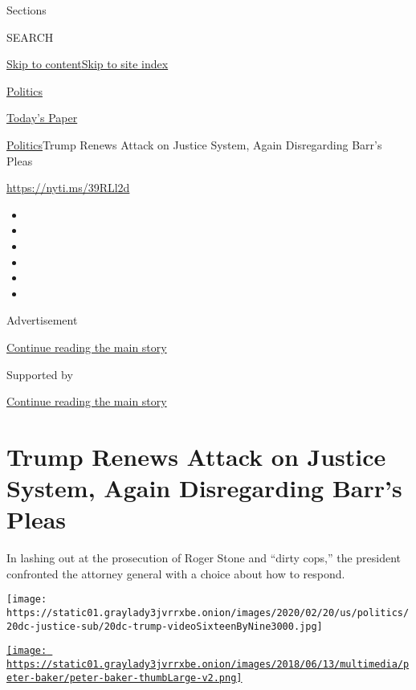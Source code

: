 Sections

SEARCH

\protect\hyperlink{site-content}{Skip to
content}\protect\hyperlink{site-index}{Skip to site index}

\href{https://www.nytimes3xbfgragh.onion/section/politics}{Politics}

\href{https://myaccount.nytimes3xbfgragh.onion/auth/login?response_type=cookie\&client_id=vi}{}

\href{https://www.nytimes3xbfgragh.onion/section/todayspaper}{Today's
Paper}

\href{/section/politics}{Politics}\textbar{}Trump Renews Attack on
Justice System, Again Disregarding Barr's Pleas

\url{https://nyti.ms/39RLl2d}

\begin{itemize}
\item
\item
\item
\item
\item
\item
\end{itemize}

Advertisement

\protect\hyperlink{after-top}{Continue reading the main story}

Supported by

\protect\hyperlink{after-sponsor}{Continue reading the main story}

\hypertarget{trump-renews-attack-on-justice-system-again-disregarding-barrs-pleas}{%
\section{Trump Renews Attack on Justice System, Again Disregarding
Barr's
Pleas}\label{trump-renews-attack-on-justice-system-again-disregarding-barrs-pleas}}

In lashing out at the prosecution of Roger Stone and ``dirty cops,'' the
president confronted the attorney general with a choice about how to
respond.

\texttt{[image: https://static01.graylady3jvrrxbe.onion/images/2020/02/20/us/politics/20dc-justice-sub/20dc-trump-videoSixteenByNine3000.jpg]}

\href{https://www.nytimes3xbfgragh.onion/by/peter-baker}{\texttt{[image: https://static01.graylady3jvrrxbe.onion/images/2018/06/13/multimedia/peter-baker/peter-baker-thumbLarge-v2.png]}}

